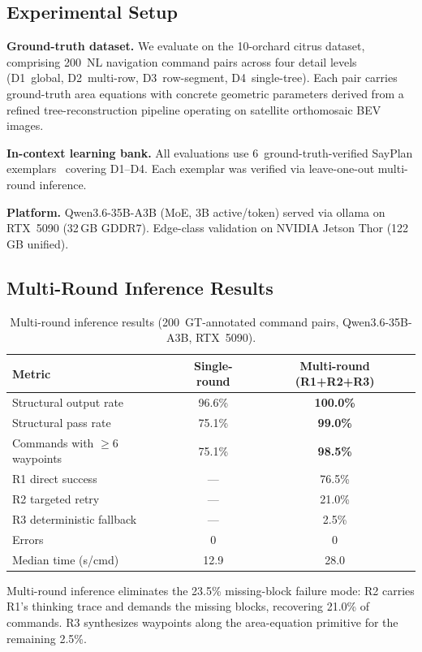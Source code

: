 \documentclass{article}
\begin{document}
\subsection{Experimental Setup}
\label{sec:setup}

\textbf{Ground-truth dataset.} We evaluate on the 10-orchard citrus dataset, comprising 200~NL navigation command pairs across four detail levels (D1~global, D2~multi-row, D3~row-segment, D4~single-tree). Each pair carries ground-truth area equations with concrete geometric parameters derived from a refined tree-reconstruction pipeline operating on satellite orthomosaic BEV images.

\textbf{In-context learning bank.} All evaluations use 6~ground-truth-verified SayPlan exemplars~\citep{rana2023sayplan} covering D1--D4. Each exemplar was verified via leave-one-out multi-round inference.

\textbf{Platform.} Qwen3.6-35B-A3B (MoE, 3B active/token) served via ollama on RTX~5090 (32\,GB GDDR7). Edge-class validation on NVIDIA Jetson Thor (122\,GB unified).

\subsection{Multi-Round Inference Results}

\begin{table}[t]
\centering
\caption{Multi-round inference results (200~GT-annotated command pairs, Qwen3.6-35B-A3B, RTX~5090).}
\label{tab:multiround}
\small
\setlength{\tabcolsep}{4pt}
\begin{tabular}{lcc}
\toprule
Metric & Single-round & Multi-round (R1+R2+R3) \\
\midrule
Structural output rate & 96.6\% & \textbf{100.0\%} \\
Structural pass rate & 75.1\% & \textbf{99.0\%} \\
Commands with $\geq$6 waypoints & 75.1\% & \textbf{98.5\%} \\
R1 direct success & --- & 76.5\% \\
R2 targeted retry & --- & 21.0\% \\
R3 deterministic fallback & --- & 2.5\% \\
Errors & 0 & 0 \\
Median time (s/cmd) & 12.9 & 28.0 \\
\bottomrule
\end{tabular}
\end{table}

Multi-round inference eliminates the 23.5\% missing-block failure mode: R2 carries R1's thinking trace and demands the missing blocks, recovering 21.0\% of commands. R3 synthesizes waypoints along the area-equation primitive for the remaining 2.5\%.
\end{document}
